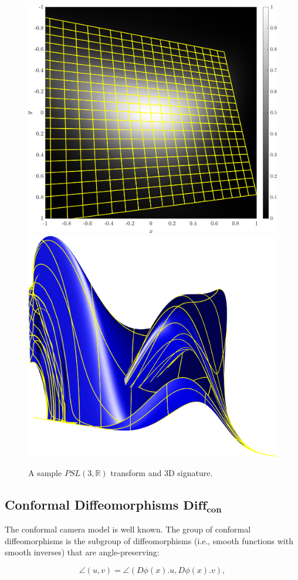 \documentclass[review,onefignum,onetabnum]{siamonline190516}
\begin{document}

\begin{figure}
\centering
\includegraphics[width=.45\textwidth]{Figs/f_transformed_PSL3R.png}
\includegraphics[width=.45\textwidth]{Figs/PSL3R_signature.png}
\caption{A sample $PSL(3,\mathbb{R})$ transform and 3D signature.}
\label{fig:PSL3R}
\end{figure}

\subsection{Conformal Diffeomorphisms $\mathbf{Diff}_{\mathbf{con}}$}

The conformal camera model is well known. The group of conformal diffeomorphisms is the subgroup of diffeomorphisms (i.e., smooth functions with smooth inverses) that are angle-preserving:

\begin{equation}
\angle (u,v) = \angle (D \phi(x) . u, D \phi(x).v),
\end{equation}
\end{document}
